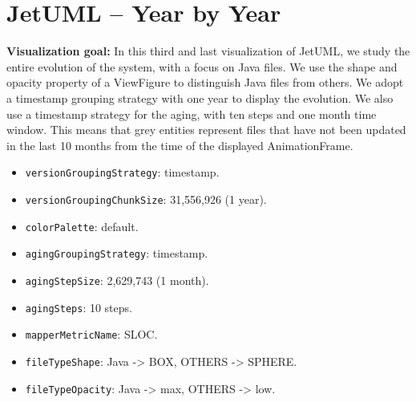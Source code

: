 \section{JetUML – Year by Year}
\textbf{Visualization goal:}
In this third and last visualization of JetUML, we study the entire evolution of the system, with a focus on Java files. 
We use the shape and opacity property of a ViewFigure to distinguish Java files from others.
We adopt a timestamp grouping strategy with one year to display the evolution. We also use a timestamp strategy for the aging, with ten steps and one month time window. This means that grey entities represent files that have not been updated in the last 10 months from the time of the displayed AnimationFrame. 
\begin{itemize}
    \item \texttt{versionGroupingStrategy}: timestamp.
    \item \texttt{versionGroupingChunkSize}: 31,556,926 (1 year). 
    \item \texttt{colorPalette}: default.
    \item \texttt{agingGroupingStrategy}: timestamp.
    \item \texttt{agingStepSize}: 2,629,743 (1 month).
    \item \texttt{agingSteps}: 10 steps. 
    \item \texttt{mapperMetricName}: SLOC. 
    \item \texttt{fileTypeShape}: Java -> BOX, OTHERS -> SPHERE. 
    \item \texttt{fileTypeOpacity}: Java -> max, OTHERS -> low. 
\end{itemize}

